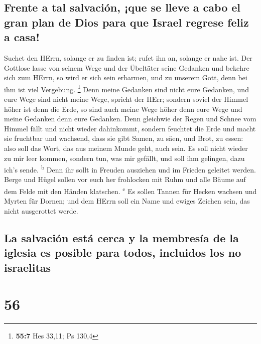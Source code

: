 \hypertarget{frente-a-tal-salvaciuxf3n-que-se-lleve-a-cabo-el-gran-plan-de-dios-para-que-israel-regrese-feliz-a-casa}{%
\subsection{Frente a tal salvación, ¡que se lleve a cabo el gran plan de
Dios para que Israel regrese feliz a
casa!}\label{frente-a-tal-salvaciuxf3n-que-se-lleve-a-cabo-el-gran-plan-de-dios-para-que-israel-regrese-feliz-a-casa}}

 Suchet den HErrn, solange er zu finden ist; rufet ihn an,
solange er nahe ist.  Der Gottlose lasse von seinem Wege
und der Übeltäter seine Gedanken und bekehre sich zum HErrn, so wird er
sich sein erbarmen, und zu unserem Gott, denn bei ihm ist viel
Vergebung. \footnote{\textbf{55:7} Hes 33,11; Ps 130,4} 
Denn meine Gedanken sind nicht eure Gedanken, und eure Wege sind nicht
meine Wege, spricht der HErr;  sondern soviel der Himmel
höher ist denn die Erde, so sind auch meine Wege höher denn eure Wege
und meine Gedanken denn eure Gedanken.  Denn gleichwie
der Regen und Schnee vom Himmel fällt und nicht wieder dahinkommt,
sondern feuchtet die Erde und macht sie fruchtbar und wachsend, dass sie
gibt Samen, zu säen, und Brot, zu essen:  also soll das
Wort, das aus meinem Munde geht, auch sein. Es soll nicht wieder zu mir
leer kommen, sondern tun, was mir gefällt, und soll ihm gelingen, dazu
ich's sende. \textsuperscript{b}  Denn ihr sollt in
Freuden ausziehen und im Frieden geleitet werden. Berge und Hügel sollen
vor euch her frohlocken mit Ruhm und alle Bäume auf dem Felde mit den
Händen klatschen. \textsuperscript{c}  Es sollen Tannen
für Hecken wachsen und Myrten für Dornen; und dem HErrn soll ein Name
und ewiges Zeichen sein, das nicht ausgerottet werde.

\hypertarget{la-salvaciuxf3n-estuxe1-cerca-y-la-membresuxeda-de-la-iglesia-es-posible-para-todos-incluidos-los-no-israelitas}{%
\subsection{La salvación está cerca y la membresía de la iglesia es
posible para todos, incluidos los no
israelitas}\label{la-salvaciuxf3n-estuxe1-cerca-y-la-membresuxeda-de-la-iglesia-es-posible-para-todos-incluidos-los-no-israelitas}}

\hypertarget{section-55}{%
\section{56}\label{section-55}}

